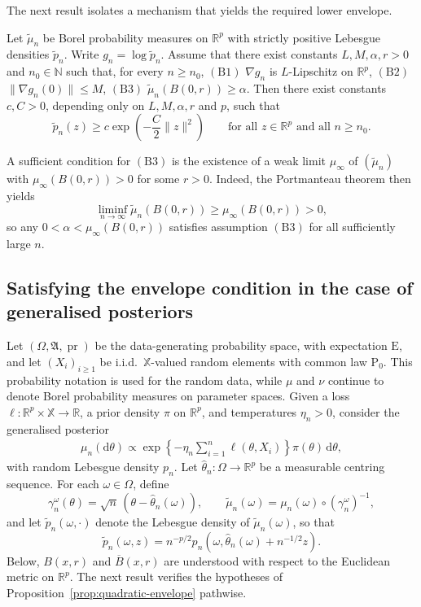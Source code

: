 \documentclass[11pt]{article}
\renewcommand{\Pr}{\operatorname{pr}}
\theoremstyle{plain}
\theoremstyle{definition}
\theoremstyle{remark}
\begin{document}
The next result isolates a mechanism that yields the required lower envelope.

\begin{prop} \label{prop:quadratic-envelope} Let $\tilde\mu_{n}$ be Borel
probability measures on $\mathbb{R}^{p}$ with strictly positive Lebesgue
densities $\tilde p_{n}$. Write $g_{n}=\log \tilde p_{n}$. Assume that there exist
constants $L,M,\alpha,r>0$ and $n_{0}\in\mathbb{N}$ such that, for
every $n\ge n_{0}$, $\mathrm{(B1)}$  $\nabla g_{n}$ is $L$-Lipschitz on $\mathbb{R}^{p}$, $\mathrm{(B2)}$  $\|\nabla g_{n}(0)\|\le M$, $\mathrm{(B3)}$ $\tilde\mu_{n}(B(0,r))\ge\alpha$.
Then there exist constants $c,C>0$, depending only on $L,M,\alpha,r$
and $p$, such that
\[
\tilde p_{n}(z)\ge c\exp\left(-\frac{C}{2}\|z\|^{2}\right)\qquad\text{for all }z\in\mathbb{R}^{p}\text{ and all }n\ge n_{0}.
\]
\end{prop}

A sufficient condition for $\mathrm{(B3)}$ is the existence of a
weak limit $\mu_{\infty}$ of $(\tilde\mu_n)$ with $\mu_{\infty}(B(0,r))>0$
for some $r>0$. Indeed, the Portmanteau theorem then yields
\[
\liminf_{n\to\infty}\tilde\mu_{n}(B(0,r))\ge\mu_{\infty}(B(0,r))>0,
\]
so any $0<\alpha<\mu_{\infty}(B(0,r))$ satisfies assumption $\mathrm{(B3)}$
for all sufficiently large $n$.

\subsection{Satisfying the envelope condition in the case of generalised posteriors}

\label{sec:stochasticVerification}

Let $(\Omega,\mathfrak{A},\Pr)$ be the data-generating probability space, with expectation $\mathrm{E}$, and let $(X_{i})_{i\ge1}$
be i.i.d.\ $\mathbb{X}$-valued random elements with common law $\mathrm{P}_{0}$.
This probability notation is used for the random data, while $\mu$ and $\nu$ continue to denote Borel probability measures on parameter spaces. Given a loss $\ell:\mathbb{R}^{p}\times\mathbb{X}\to\mathbb{R}$,
a prior density $\pi$ on $\mathbb{R}^{p}$, and temperatures $\eta_{n}>0$,
consider the generalised posterior \citep{bissiri2016general}
\begin{align}
\mu_{n}(\mathrm{d}\theta)\propto\exp\left\{ -\eta_{n}\sum_{i=1}^{n}\ell(\theta,X_{i})\right\} \pi(\theta)\,\mathrm{d}\theta,\label{eq:Gibbs-posterior}
\end{align}
with random Lebesgue density $p_{n}$. Let $\hat{\theta}_{n}:\Omega\to\mathbb{R}^{p}$
be a measurable centring sequence. For each $\omega\in\Omega$, define
\[
\gamma_{n}^{\omega}(\theta)=\sqrt{n}\,(\theta-\hat{\theta}_{n}(\omega)),\qquad\tilde\mu_n(\omega)=\mu_{n}(\omega)\circ(\gamma_{n}^{\omega})^{-1},
\]
and let $\tilde p_{n}(\omega,\cdot)$ denote the Lebesgue density of $\tilde\mu_n(\omega)$,
so that
\[
\tilde p_{n}(\omega,z)=n^{-p/2}p_{n}\!\left(\omega,\hat{\theta}_{n}(\omega)+n^{-1/2}z\right).
\]
Below, $B(x,r)$ and $\overline{B}(x,r)$ are understood with respect to the Euclidean metric on $\mathbb{R}^{p}$.
The next result verifies the hypotheses
of Proposition~\ref{prop:quadratic-envelope} pathwise.
\end{document}
